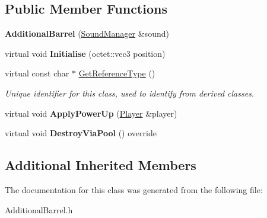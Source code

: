 \subsection*{Public Member Functions}
\begin{DoxyCompactItemize}
\item 
\hypertarget{class_arena_1_1_power_ups_1_1_additional_barrel_a314fac6aa6be95075729d73d3deca2ad}{{\bfseries Additional\+Barrel} (\hyperlink{class_arena_1_1_sound_manager}{Sound\+Manager} \&sound)}\label{class_arena_1_1_power_ups_1_1_additional_barrel_a314fac6aa6be95075729d73d3deca2ad}

\item 
\hypertarget{class_arena_1_1_power_ups_1_1_additional_barrel_ac645977663b5ede02067f9107ec5b19d}{virtual void {\bfseries Initialise} (octet\+::vec3 position)}\label{class_arena_1_1_power_ups_1_1_additional_barrel_ac645977663b5ede02067f9107ec5b19d}

\item 
\hypertarget{class_arena_1_1_power_ups_1_1_additional_barrel_aac9fb5dfee01e692c8ad28b84c9aaf68}{virtual const char $\ast$ \hyperlink{class_arena_1_1_power_ups_1_1_additional_barrel_aac9fb5dfee01e692c8ad28b84c9aaf68}{Get\+Reference\+Type} ()}\label{class_arena_1_1_power_ups_1_1_additional_barrel_aac9fb5dfee01e692c8ad28b84c9aaf68}

\begin{DoxyCompactList}\small\item\em Unique identifier for this class, used to identify from derived classes. \end{DoxyCompactList}\item 
\hypertarget{class_arena_1_1_power_ups_1_1_additional_barrel_af98ad7a3d1173c3d6ed4d5ea4aa7e9e0}{virtual void {\bfseries Apply\+Power\+Up} (\hyperlink{class_arena_1_1_player}{Player} \&player)}\label{class_arena_1_1_power_ups_1_1_additional_barrel_af98ad7a3d1173c3d6ed4d5ea4aa7e9e0}

\item 
\hypertarget{class_arena_1_1_power_ups_1_1_additional_barrel_afa9ac2ec55662dc7a3818691a86835bb}{virtual void {\bfseries Destroy\+Via\+Pool} () override}\label{class_arena_1_1_power_ups_1_1_additional_barrel_afa9ac2ec55662dc7a3818691a86835bb}

\end{DoxyCompactItemize}
\subsection*{Additional Inherited Members}


The documentation for this class was generated from the following file\+:\begin{DoxyCompactItemize}
\item 
Additional\+Barrel.\+h\end{DoxyCompactItemize}
